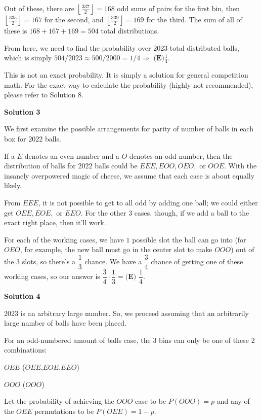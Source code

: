 \begin{enumerate}
 Out of these, there are \( \left\lfloor\frac{337}{2}\right\rfloor = 168 \) odd sums of pairs for the first bin, then \( \left\lfloor\frac{335}{2}\right\rfloor = 167 \) for the second, and \( \left\lfloor\frac{339}{2}\right\rfloor = 169 \) for the third. The sum of all of these is \( 168 + 167 + 169 = 504 \) total distributions.

 From here, we need to find the probability over 2023 total distributed balls, which is simply \( 504/2023 \approx 500/2000 = 1/4 \Rightarrow \) $\boxed{\textbf{(E)} \frac{1}{4}}$.

 This is not an exact probability. It is simply a solution for general competition math. For the exact way to calculate the probability (highly not recommended), please refer to Solution 8.

 



\textbf{Solution 3}

We first examine the possible arrangements for parity of number of balls in each box for $2022$ balls.

 If a $E$ denotes an even number and a $O$ denotes an odd number, then the distribution of balls for $2022$ balls could be $EEE,EOO,OEO,$ or $OOE$. With the insanely overpowered magic of cheese, we assume that each case is about equally likely.

 From $EEE$, it is not possible to get to all odd by adding one ball; we could either get $OEE,EOE,$ or $EEO$. For the other $3$ cases, though, if we add a ball to the exact right place, then it'll work.

 For each of the working cases, we have $1$ possible slot the ball can go into (for $OEO$, for example, the new ball must go in the center slot to make $OOO$) out of the $3$ slots, so there's a $\dfrac13$ chance. We have a $\dfrac34$ chance of getting one of these working cases, so our answer is $\dfrac34\cdot\dfrac13=\boxed{\textbf{(E) }\dfrac14.}$




\textbf{Solution 4}

2023 is an arbitrary large number. So, we proceed assuming that an arbitrarily large number of balls have been placed.

 For an odd-numbered amount of balls case, the 3 bins can only be one of these 2 combinations:

 $OEE$ ($OEE$,$EOE$,$EEO$)

 $OOO$ ($OOO$)

 Let the probability of achieving the $OOO$ case to be $P(OOO) = p$ and any of the $OEE$ permutations to be $P(OEE) = 1-p$.


\end{enumerate}
